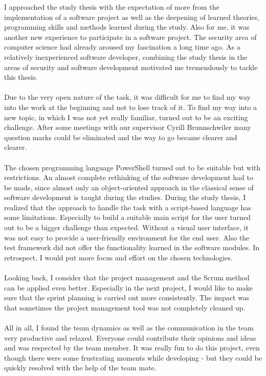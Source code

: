 I approached the study thesis with the expectation of more from the implementation of a software project as well as the deepening of learned theories, programming skills and methods learned during the study. Also for me, it was another new experience to participate in a software project. The security area of computer science had already aroused my fascination a long time ago. As a relatively inexperienced software developer, combining the study thesis in the areas of security and software development motivated me tremendously to tackle this thesis.
\\\\
Due to the very open nature of the task, it was difficult for me to find my way into the work at the beginning and not to lose track of it. To find my way into a new topic, in which I was not yet really familiar, turned out to be an exciting challenge. After some meetings with our supervisor Cyrill Brunnschwiler many question marks could be eliminated and the way to go became clearer and clearer.
\\\\
The chosen programming language PowerShell turned out to be suitable but with restrictions. An almost complete rethinking of the software development had to be made, since almost only an object-oriented approach in the classical sense of software development is taught during the studies. During the study thesis, I realized that the approach to handle the task with a script-based language has some limitations. Especially to build a suitable main script for the user turned out to be a bigger challenge than expected. Without a visual user interface, it was not easy to provide a user-friendly environment for the end user. Also the test framework did not offer the functionality learned in the software modules. In retrospect, I would put more focus and effort on the chosen technologies.
\\\\
Looking back, I consider that the project management and the Scrum method can be applied even better. Especially in the next project, I would like to make sure that the sprint planning is carried out more consistently. The impact was that sometimes the project management tool was not completely cleaned up.
\\\\
All in all, I found the team dynamics as well as the communication in the team very productive and relaxed. Everyone could contribute their opinions and ideas and was respected by the team member. It was really fun to do this project, even though there were some frustrating moments while developing - but they could be quickly resolved with the help of the team mate. 
